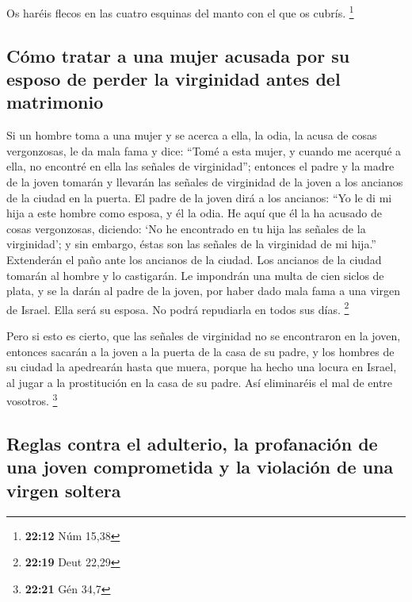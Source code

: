  Os haréis flecos en las cuatro esquinas del manto con el
que os cubrís. \footnote{\textbf{22:12} Núm 15,38}

\hypertarget{cuxf3mo-tratar-a-una-mujer-acusada-por-su-esposo-de-perder-la-virginidad-antes-del-matrimonio}{%
\subsection{Cómo tratar a una mujer acusada por su esposo de perder la
virginidad antes del
matrimonio}\label{cuxf3mo-tratar-a-una-mujer-acusada-por-su-esposo-de-perder-la-virginidad-antes-del-matrimonio}}

 Si un hombre toma a una mujer y se acerca a ella, la
odia,  la acusa de cosas vergonzosas, le da mala fama y
dice: ``Tomé a esta mujer, y cuando me acerqué a ella, no encontré en
ella las señales de virginidad'';  entonces el padre y la
madre de la joven tomarán y llevarán las señales de virginidad de la
joven a los ancianos de la ciudad en la puerta.  El padre
de la joven dirá a los ancianos: ``Yo le di mi hija a este hombre como
esposa, y él la odia.  He aquí que él la ha acusado de
cosas vergonzosas, diciendo: `No he encontrado en tu hija las señales de
la virginidad'; y sin embargo, éstas son las señales de la virginidad de
mi hija.'' Extenderán el paño ante los ancianos de la ciudad.
 Los ancianos de la ciudad tomarán al hombre y lo
castigarán.  Le impondrán una multa de cien siclos de
plata, y se la darán al padre de la joven, por haber dado mala fama a
una virgen de Israel. Ella será su esposa. No podrá repudiarla en todos
sus días. \footnote{\textbf{22:19} Deut 22,29}

 Pero si esto es cierto, que las señales de virginidad no
se encontraron en la joven,  entonces sacarán a la joven
a la puerta de la casa de su padre, y los hombres de su ciudad la
apedrearán hasta que muera, porque ha hecho una locura en Israel, al
jugar a la prostitución en la casa de su padre. Así eliminaréis el mal
de entre vosotros. \footnote{\textbf{22:21} Gén 34,7}

\hypertarget{reglas-contra-el-adulterio-la-profanaciuxf3n-de-una-joven-comprometida-y-la-violaciuxf3n-de-una-virgen-soltera}{%
\subsection{Reglas contra el adulterio, la profanación de una joven
comprometida y la violación de una virgen
soltera}\label{reglas-contra-el-adulterio-la-profanaciuxf3n-de-una-joven-comprometida-y-la-violaciuxf3n-de-una-virgen-soltera}}

